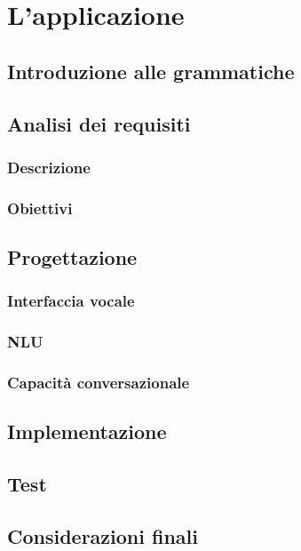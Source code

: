 
\chapter{L'applicazione}
\label{cap:applicazione}


\section{Introduzione alle grammatiche}

\section{Analisi dei requisiti}
	\subsection{Descrizione}
	\subsection{Obiettivi}

\section{Progettazione}
	\subsection{Interfaccia vocale}
	\subsection{NLU}
	\subsection{Capacità conversazionale}

\section{Implementazione}

\section{Test}

\section{Considerazioni finali}
